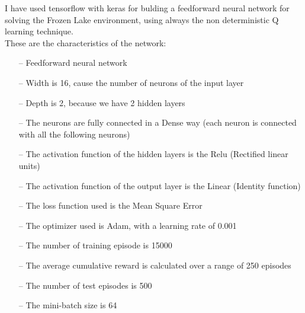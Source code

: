 \documentclass{article}
\begin{document}
\begin{center}
\centering
{}
\end{center}

\clearpage

I have used tensorflow with keras for bulding a feedforward neural network for solving the Frozen Lake environment, using always the non deterministic Q learning technique.
\\
These are the characteristics of the network:
\begin{itemize}
\item[--] Feedforward neural network
\item[--] Width is 16, cause the number of neurons of the input layer
\item[--] Depth is 2, because we have 2 hidden layers
\item[--] The neurons are fully connected in a Dense way (each neuron is connected with all the following neurons)
\item[--] The activation function of the hidden layers is the Relu (Rectified linear units)
\item[--] The activation function of the output layer is the Linear (Identity function)
\item[--] The loss function used is the Mean Square Error
\item[--] The optimizer used is Adam, with a learning rate of 0.001
\item[--] The number of training episode is 15000
\item[--] The average cumulative reward is calculated over a range of 250 episodes
\item[--] The number of test episodes is 500
\item[--] The mini-batch size is 64
\end{itemize}
\end{document}
